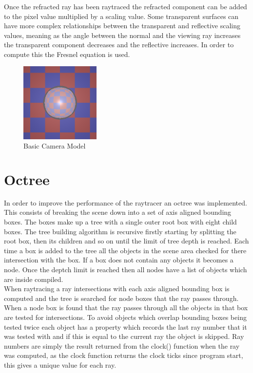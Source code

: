 \documentclass{article}
\begin{document}
Once the refracted ray has been raytraced the refracted component can be added
to the pixel value multiplied by a scaling value. Some transparent surfaces
can have more complex relationships between the transparent and reflective
scaling values, meaning as the angle between the normal and the viewing ray increases
the transparent component decreases and the reflective increases. In order to
compute this the Fresnel equation is used.

\begin{figure}[H]
  \begin{center}
  \includegraphics[width=150px]{Images/transparent.png}
  \caption{Basic Camera Model}
  \label{fig:octree}
  \end{center}
\end{figure}

\section{Octree}

In order to improve the performance of the raytracer an octree was implemented.
This consists of breaking the scene down into a set of axis aligned bounding
boxes. The boxes make up a tree with a single outer root box with eight child
boxes. The tree building algorithm is recursive firstly starting by splitting
the root box, then its children and so on until the limit of tree depth is
reached. Each time a box is added to the tree all the objects in the scene area
checked for there intersection with the box. If a box does not contain any objects
it becomes a node. Once the deptch limit is reached then all nodes have a list
of objects which are inside compiled.\\

When raytracing a ray intersections with each axis aligned bounding box is computed
and the tree is searched for node boxes that the ray passes through. When a
node box is found that the ray passes through all the objects in that box
are tested for intersections. To avoid objects which overlap bounding boxes
being tested twice each object has a property which records the last ray number
that it was tested with and if this is equal to the current ray the object is
skipped. Ray numbers are simply the result returned from the clock() function
when the ray was computed, as the clock function returns the clock ticks since
program start, this gives a unique value for each ray.\\
\end{document}
